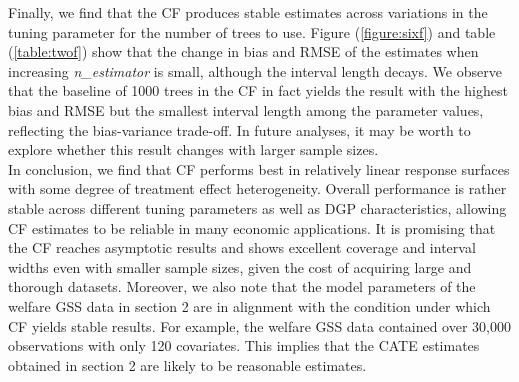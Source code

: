 \documentclass[12pt]{article}
\begin{document}
Finally, we find that the CF produces stable estimates across variations in
the tuning parameter for the number of trees to use. Figure (\ref{figure:sixf})
and table (\ref{table:twof}) show that the change in bias and RMSE of the
estimates when increasing \textit{n\_estimator} is small, although the
interval length decays. We observe that the baseline of 1000 trees in the CF in
fact yields the result with the highest bias and RMSE but the smallest interval
length among the parameter values, reflecting the bias-variance trade-off. In
future analyses, it may be worth to explore whether this result changes with
larger sample sizes. \\

In conclusion, we find that CF performs best in relatively linear response
surfaces with some degree of treatment effect heterogeneity. Overall performance
is rather stable across different tuning parameters as well as DGP
characteristics, allowing CF estimates to be reliable in many economic
applications. It is promising that the CF reaches asymptotic results and shows
excellent coverage and interval widths even with smaller sample sizes, given the
cost of acquiring large and thorough datasets. Moreover, we also note that the
model parameters of the welfare GSS data in section 2 are in alignment with the
condition under which CF yields stable results. For example, the welfare GSS
data contained over 30,000 observations with only 120 covariates. This implies
that the CATE estimates obtained in section 2 are likely to be reasonable
estimates.
\end{document}
